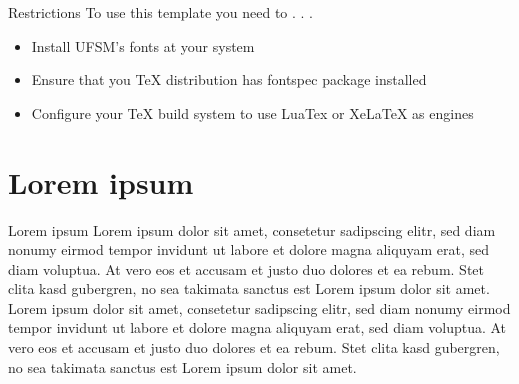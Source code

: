 \documentclass{beamer}
\begin{document}
\begin{frame}{Restrictions}
	To use this template you need to . . .
	\begin{itemize}
	\item Install UFSM's fonts at your system
	\item Ensure that you TeX distribution has fontspec package installed
	\item Configure your TeX build system to use LuaTex or XeLaTeX as engines
	\end{itemize}
\end{frame}

\section{Lorem ipsum}
\begin{frame}{Lorem ipsum}
	Lorem ipsum dolor sit amet, consetetur sadipscing elitr, sed diam nonumy eirmod tempor invidunt ut labore et dolore magna aliquyam erat, sed diam voluptua. At vero eos et accusam et justo duo dolores et ea rebum. Stet clita kasd gubergren, no sea takimata sanctus est Lorem ipsum dolor sit amet. Lorem  ipsum dolor sit amet, consetetur sadipscing elitr, sed diam nonumy eirmod tempor invidunt ut labore et dolore magna aliquyam erat, sed diam voluptua. At vero eos et accusam et justo duo dolores et ea rebum. Stet clita kasd gubergren, no sea takimata sanctus est Lorem ipsum dolor sit amet.
\end{frame}
\end{document}
